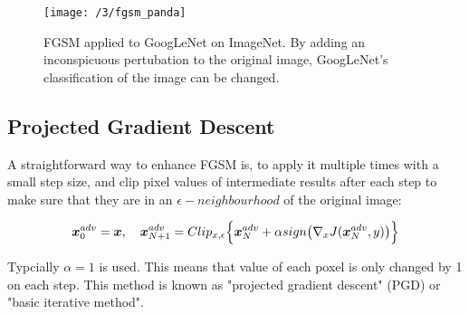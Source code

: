 \begin{figure}
	\centering
	\texttt{[image: /3/fgsm\_panda]}
    \caption{FGSM applied to GoogLeNet \cite{szegedy2015going} on ImageNet. By
    adding an inconspicuous pertubation to the original image, GoogLeNet's
    classification of the image can be changed.} 
	\label{fig:fgsm_panda}
\end{figure}

\subsection{Projected Gradient Descent}
A straightforward way to enhance FGSM is, to apply it multiple times with a
small step size, and clip pixel values of intermediate results after each step
to make sure that they are in an $\epsilon-neighbourhood$  of the original
image:


\begin{equation}\label{eq:fgsm}
    \boldsymbol{x}^{adv}_{0} = \boldsymbol{x}, \quad \boldsymbol{x}^{adv}_{N + 1}=Clip_{x, \epsilon} \Big \{\boldsymbol{x}^{adv}_{N} + \alpha sign\big(\nabla_{x}J(\boldsymbol{x}^{adv}_{N}, y)\big)  \Big\}
\end{equation}

Typcially $\alpha = 1$ is used. This means that value of each poxel is only
changed by 1 on each step. This method is known as "projected gradient descent"
(PGD) or "basic iterative method". \cite{kurakin2016adversarial, madry2017towards}